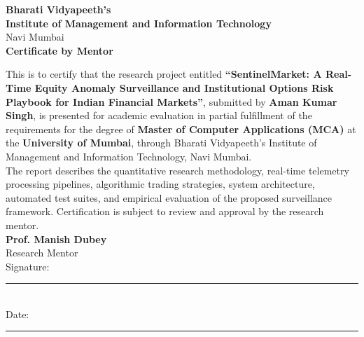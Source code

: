 \begin{center}
{\large \textbf{Bharati Vidyapeeth's}}\\[0.15cm]
{\large \textbf{Institute of Management and Information Technology}}\\[0.15cm]
{\normalsize Navi Mumbai}\\[1.5cm]

{\LARGE \textbf{Certificate by Mentor}}\\[1.5cm]
\end{center}

\noindent This is to certify that the research project entitled \textbf{``SentinelMarket: A Real-Time Equity Anomaly Surveillance and Institutional Options Risk Playbook for Indian Financial Markets''}, submitted by \textbf{Aman Kumar Singh}, is presented for academic evaluation in partial fulfillment of the requirements for the degree of \textbf{Master of Computer Applications (MCA)} at the \textbf{University of Mumbai}, through Bharati Vidyapeeth's Institute of Management and Information Technology, Navi Mumbai.\\[0.6cm]

\noindent The report describes the quantitative research methodology, real-time telemetry processing pipelines, algorithmic trading strategies, system architecture, automated test suites, and empirical evaluation of the proposed surveillance framework. Certification is subject to review and approval by the research mentor.\\[3.5cm]

\noindent \textbf{Prof. Manish Dubey}\\[0.1cm]
Research Mentor\\[1.5cm]

\noindent Signature: \rule{6cm}{0.4pt}\\[1.2cm]
\noindent Date: \rule{6cm}{0.4pt}

\newpage
